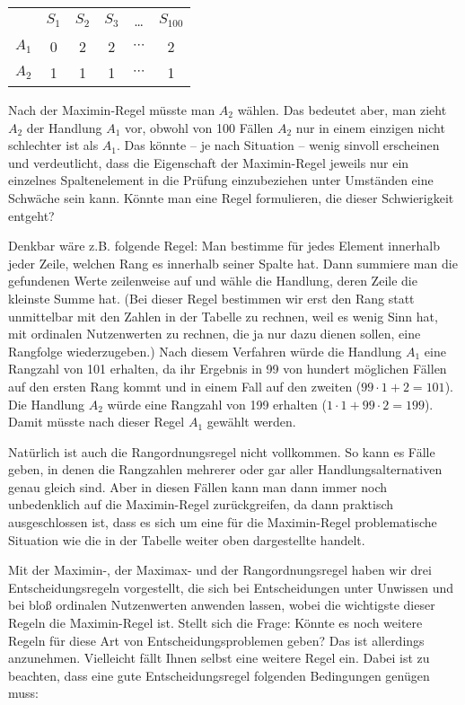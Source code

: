 \begin{center}
\begin{tabular}{c|c|c|c|c|c|}
\multicolumn{1}{c}{ } & \multicolumn{1}{c}{$S_1$} &
\multicolumn{1}{c}{$S_2$} & \multicolumn{1}{c}{$S_3$} & 
\multicolumn{1}{c}{\ldots} & \multicolumn{1}{c}{$S_{100}$} \\ \cline{2-6}
$A_1$ & 0 & 2 & 2 & $\cdots$ & 2 \\ \cline{2-6}
$A_2$ & 1 & 1 & 1 & $\cdots$ & 1 \\ \cline{2-6}
\end{tabular}
\end{center}

Nach der Maximin-Regel müsste man $A_2$ wählen. Das bedeutet aber, man zieht
$A_2$ der Handlung $A_1$ vor, obwohl von 100 Fällen $A_2$ nur in einem einzigen
nicht schlechter ist als $A_1$. Das könnte -- je nach Situation -- wenig 
sinvoll erscheinen und verdeutlicht, dass die Eigenschaft der Maximin-Regel
jeweils nur ein einzelnes Spaltenelement in die Prüfung einzubeziehen unter
Umständen eine Schwäche sein kann. Könnte man eine Regel formulieren, die
dieser Schwierigkeit entgeht? 

Denkbar wäre z.B. folgende Regel: Man
bestimme für jedes Element innerhalb jeder Zeile, welchen Rang es innerhalb
seiner Spalte hat. Dann summiere man die gefundenen Werte zeilenweise auf und
wähle die Handlung, deren Zeile die kleinste Summe hat. (Bei dieser Regel
bestimmen wir erst den Rang statt unmittelbar mit den Zahlen in der Tabelle zu
rechnen, weil es wenig Sinn hat, mit ordinalen Nutzenwerten zu rechnen, die ja
nur dazu dienen sollen, eine Rangfolge wiederzugeben.) Nach diesem Verfahren
würde die Handlung $A_1$ eine Rangzahl von 101 erhalten, da ihr Ergebnis in 99
von hundert möglichen Fällen auf den ersten Rang kommt und in einem Fall auf den
zweiten ($99 \cdot 1 + 2 = 101$). Die Handlung $A_2$ würde eine Rangzahl von 199
erhalten ($1 \cdot 1 + 99 \cdot 2 = 199$). Damit müsste nach dieser Regel $A_1$
gewählt werden.

Natürlich ist auch die Rangordnungsregel nicht vollkommen. So kann es Fälle
geben, in denen die Rangzahlen mehrerer oder gar aller
Handlungsalternativen genau gleich sind. Aber in diesen Fällen kann man dann
immer noch unbedenklich auf die Maximin-Regel zurückgreifen, da dann praktisch
ausgeschlossen ist, dass es sich um eine für die Maximin-Regel problematische
Situation wie die in der Tabelle weiter oben dargestellte handelt.

Mit der Maximin-, der Maximax- und der Rangordnungsregel haben wir drei
Entscheidungsregeln vorgestellt, die sich bei Entscheidungen unter Unwissen und
bei bloß ordinalen Nutzenwerten anwenden lassen, wobei die wichtigste dieser
Regeln die Maximin-Regel ist. Stellt sich die Frage: Könnte es noch weitere Regeln für diese Art von
Entscheidungsproblemen geben? Das ist allerdings anzunehmen. Vielleicht fällt
Ihnen selbst eine weitere Regel ein. Dabei ist zu beachten, dass eine gute
Entscheidungsregel folgenden Bedingungen genügen muss:

